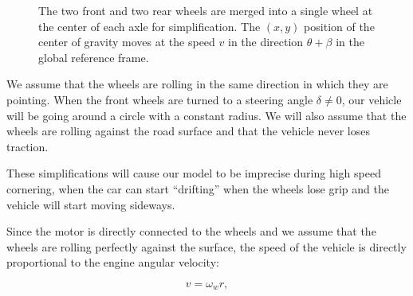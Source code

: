 \begin{figure}[p]
	
	\caption{The two front and two rear wheels are merged into a single wheel at the center of each axle for simplification. The $(x,y)$ position of the center of gravity moves at the speed $v$ in the direction $\theta+\beta$ in the global reference frame.}
	\label{fig:kinematic_bicycle}
\end{figure}

We assume that the wheels are rolling in the same direction in which they are pointing. When the front wheels are turned to a steering angle $\delta\neq 0$, our vehicle will be going around a circle with a constant radius. We will also assume that the wheels are rolling against the road surface and that the vehicle never loses traction.

These simplifications will cause our model to be imprecise during high speed cornering, when the car can start ``drifting'' when the wheels lose grip and the vehicle will start moving sideways.

Since the motor is directly connected to the wheels and we assume that the wheels are rolling perfectly against the surface, the speed of the vehicle is directly proportional to the engine angular velocity:

\begin{equation*}
v=\omega_w r,
\end{equation*}

